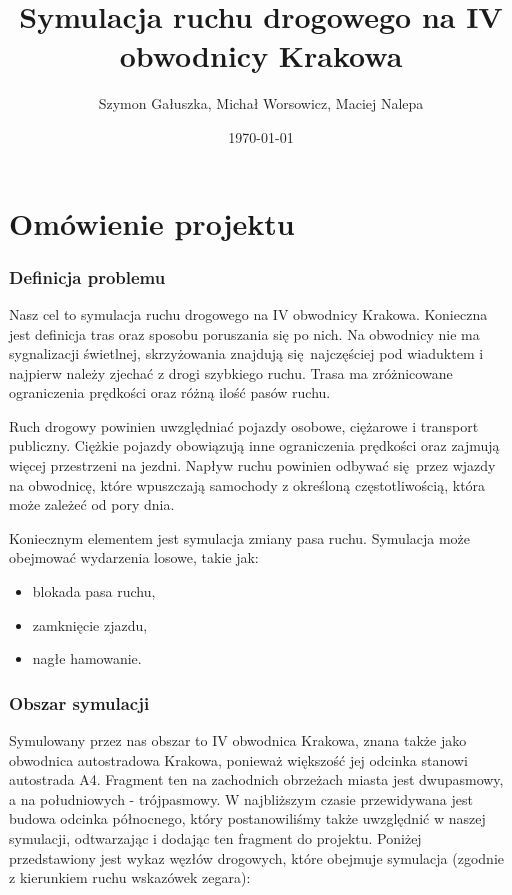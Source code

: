 \documentclass[a4paper,12pt]{article}
\title{Symulacja ruchu drogowego na IV obwodnicy Krakowa}
\author{Szymon Gałuszka, Michał Worsowicz, Maciej Nalepa}
\date{\today}
\begin{document}
    \maketitle

    \part{Omówienie projektu}

	\section{Definicja problemu}
	
	Nasz cel to symulacja ruchu drogowego na IV obwodnicy Krakowa.
	Konieczna jest definicja tras oraz sposobu poruszania się po nich.
	Na obwodnicy nie ma sygnalizacji świetlnej, skrzyżowania znajdują się najczęściej pod wiaduktem i najpierw należy zjechać z drogi szybkiego ruchu.
	Trasa ma zróżnicowane ograniczenia prędkości oraz różną ilość pasów ruchu.
	
	Ruch drogowy powinien uwzględniać pojazdy osobowe, ciężarowe i transport publiczny.
	Ciężkie pojazdy obowiązują inne ograniczenia prędkości oraz zajmują więcej przestrzeni na jezdni.
	Napływ ruchu powinien odbywać się przez wjazdy na obwodnicę, które wpuszczają samochody z określoną częstotliwością, która może zależeć od pory dnia.
	
	Koniecznym elementem jest symulacja zmiany pasa ruchu. 
	Symulacja może obejmować wydarzenia losowe, takie jak:
	
	\begin{itemize}
		\item blokada pasa ruchu,
		\item zamknięcie zjazdu,
		\item nagłe hamowanie.
    \end{itemize}
    
    \section{Obszar symulacji}
	Symulowany przez nas obszar to IV obwodnica Krakowa, znana także jako obwodnica autostradowa Krakowa, ponieważ większość jej odcinka stanowi autostrada A4. Fragment ten na zachodnich obrzeżach miasta jest dwupasmowy, a na południowych - trójpasmowy. W najbliższym czasie przewidywana jest budowa odcinka północnego, który postanowiliśmy także uwzględnić w naszej symulacji, odtwarzając i dodając ten fragment do projektu. Poniżej przedstawiony jest wykaz węzłów drogowych, które obejmuje symulacja (zgodnie z kierunkiem ruchu wskazówek zegara):
	
\end{document}
